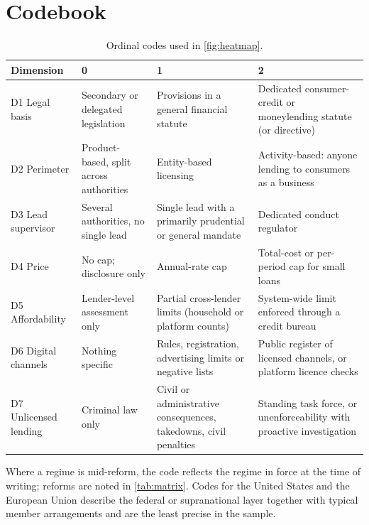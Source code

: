 \documentclass[11pt]{article}
\theoremstyle{plain}
\theoremstyle{definition}
\theoremstyle{remark}
\begin{document}
\section{Codebook}\label{app:codebook}

\begin{table}[htbp]
\centering\small
\caption{Ordinal codes used in \cref{fig:heatmap}.}
\label{tab:codebook}
\begin{tabularx}{\textwidth}{P{2.5cm}LLL}
\toprule
Dimension & 0 & 1 & 2 \\
\midrule
D1 Legal basis & Secondary or delegated legislation & Provisions in a general financial statute & Dedicated consumer-credit or moneylending statute (or directive) \\
D2 Perimeter & Product-based, split across authorities & Entity-based licensing & Activity-based: anyone lending to consumers as a business \\
D3 Lead supervisor & Several authorities, no single lead & Single lead with a primarily prudential or general mandate & Dedicated conduct regulator \\
D4 Price & No cap; disclosure only & Annual-rate cap & Total-cost or per-period cap for small loans \\
D5 Affordability & Lender-level assessment only & Partial cross-lender limits (household or platform counts) & System-wide limit enforced through a credit bureau \\
D6 Digital channels & Nothing specific & Rules, registration, advertising limits or negative lists & Public register of licensed channels, or platform licence checks \\
D7 Unlicensed lending & Criminal law only & Civil or administrative consequences, takedowns, civil penalties & Standing task force, or unenforceability with proactive investigation \\
\bottomrule
\end{tabularx}
\end{table}

Where a regime is mid-reform, the code reflects the regime in force at the time of writing; reforms are noted in \cref{tab:matrix}. Codes for the United States and the European Union describe the federal or supranational layer together with typical member arrangements and are the least precise in the sample.

\end{document}
